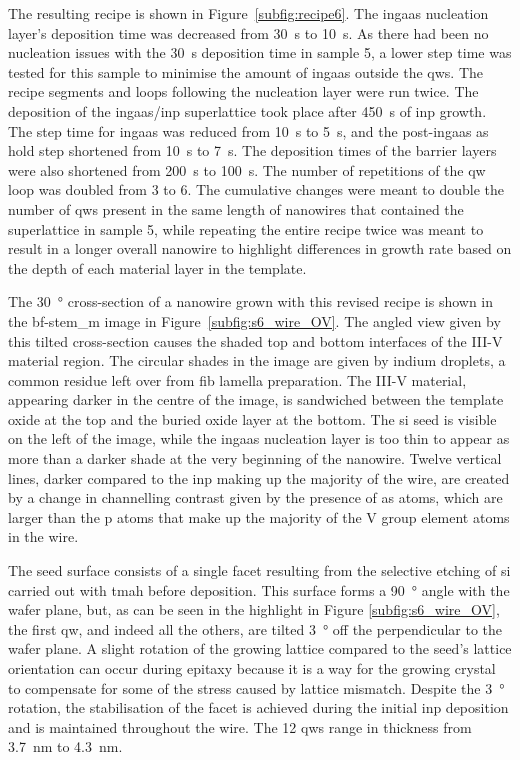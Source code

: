 The resulting recipe is shown in Figure~\ref{subfig:recipe6}. The \acs{ingaas} nucleation layer's deposition time was decreased from \qty{30}{\second} to \qty{10}{\second}. As there had been no nucleation issues with the \qty{30}{\second} deposition time in sample 5, a lower step time was tested for this sample to minimise the amount of \acs{ingaas} outside the \acl{qw}s. The recipe segments and loops following the nucleation layer were run twice. The deposition of the \acs{ingaas}/\acs{inp} superlattice took place after \qty{450}{\second} of \acs{inp} growth. The step time for \acs{ingaas} was reduced from \qty{10}{\second} to \qty{5}{\second}, and the post-\acs{ingaas} \acl{as} hold step shortened from \qty{10}{\second} to \qty{7}{\second}. The deposition times of the barrier layers were also shortened from \qty{200}{\second} to \qty{100}{\second}. The number of repetitions of the \acl{qw} loop was doubled from \num{3} to \num{6}. The cumulative changes were meant to double the number of \acl{qw}s present in the same length of nanowires that contained the superlattice in sample 5, while repeating the entire recipe twice was meant to result in a longer overall nanowire to highlight differences in growth rate based on the depth of each material layer in the template.

The \qty{30}{\degree} cross-section of a nanowire grown with this revised recipe is shown in the \acs{bf}-\acs{stem_m} image in Figure~\ref{subfig:s6_wire_OV}. The angled view given by this tilted cross-section causes the shaded top and bottom interfaces of the III-V material region. The circular shades in the image are given by indium droplets, a common residue left over from \acs{fib} lamella preparation. The III-V material, appearing darker in the centre of the image, is sandwiched between the template oxide at the top and the buried oxide layer at the bottom. The \acs{si} seed is visible on the left of the image, while the \acs{ingaas} nucleation layer is too thin to appear as more than a darker shade at the very beginning of the nanowire. Twelve vertical lines, darker compared to the \acs{inp} making up the majority of the wire, are created by a change in channelling contrast given by the presence of \acl{as} atoms, which are larger than the \acl{p} atoms that make up the majority of the V group element atoms in the wire.

The seed surface consists of a single  facet resulting from the selective etching of \acs{si} carried out with \acs{tmah} before deposition. This surface forms a \qty{90}{\degree} angle with the wafer plane, but, as can be seen in the highlight in Figure \ref{subfig:s6_wire_OV}, the first \acl{qw}, and indeed all the others, are tilted \qty{3}{\degree} off the perpendicular to the wafer plane. A slight rotation of the growing lattice compared to the seed's lattice orientation can occur during epitaxy because it is a way for the growing crystal to compensate for some of the stress caused by lattice mismatch. Despite the \qty{3}{\degree} rotation, the stabilisation of the  facet is achieved during the initial \acs{inp} deposition and is maintained throughout the wire. The \num{12} \acl{qw}s range in thickness from \qty{3.7}{\nano\metre} to \qty{4.3}{\nano\metre}.

